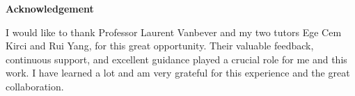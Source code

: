 \clearpage
\null
\vfil
\thispagestyle{plain}
\begin{center}\textbf{Acknowledgement}\end{center}
I would like to thank Professor Laurent Vanbever and my two tutors Ege Cem Kirci and Rui Yang, for this great opportunity. Their valuable feedback, continuous support, and excellent guidance played a crucial role for me and this work. I have learned a lot and am very grateful for this experience and the great collaboration.
\vfil
\clearpage 
